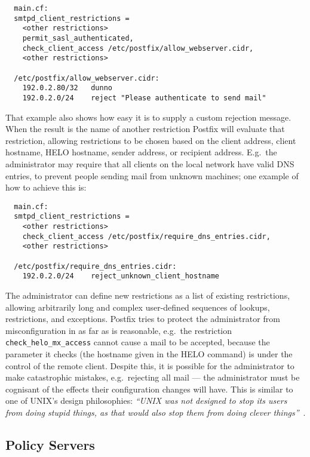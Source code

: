 \begin{verbatim}
  main.cf:
  smtpd_client_restrictions =
    <other restrictions>
    permit_sasl_authenticated,
    check_client_access /etc/postfix/allow_webserver.cidr,
    <other restrictions>

  /etc/postfix/allow_webserver.cidr:
    192.0.2.80/32   dunno
    192.0.2.0/24    reject "Please authenticate to send mail"
\end{verbatim}

That example also shows how easy it is to supply a custom rejection
message.  When the result is the name of another restriction Postfix will
evaluate that restriction, allowing restrictions to be chosen based on the
client  address, client hostname, HELO hostname, sender
address, or recipient address.  E.g.\ the administrator may require that
all clients on the local network have valid DNS entries, to prevent people
sending mail from unknown machines; one example of how to achieve this is:

\begin{verbatim}
  main.cf:
  smtpd_client_restrictions =
    <other restrictions>
    check_client_access /etc/postfix/require_dns_entries.cidr,
    <other restrictions>

  /etc/postfix/require_dns_entries.cidr:
    192.0.2.0/24    reject_unknown_client_hostname
\end{verbatim}

The administrator can define new restrictions as a list of existing
restrictions, allowing arbitrarily long and complex user-defined sequences
of lookups, restrictions, and exceptions.  Postfix tries to protect the
administrator from misconfiguration in as far as is reasonable, e.g.\ the
restriction \texttt{check\_helo\_mx\_access} cannot cause a mail to be
accepted, because the parameter it checks (the hostname given in the HELO
command) is under the control of the remote client.  Despite this, it is
possible for the administrator to make catastrophic mistakes, e.g.\
rejecting all mail --- the administrator must be cognisant of the effects
their configuration changes will have.  This is similar to one of UNIX's
design philosophies: \textit{``UNIX was not designed to stop its users from
doing stupid things, as that would also stop them from doing clever
things''\/}~\cite{unix-philosophy}.

\subsection{Policy Servers}

